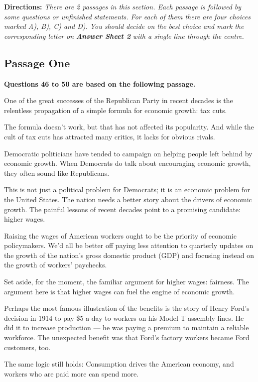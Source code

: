 \documentclass[UTF8,11pt]{ctexart}
\begin{document}
\textbf{Directions: }\textit{There are 2 passages in this section. Each passage is followed by some questions or unfinished} \textit{statements. For each of them there are four choices marked A), B), C) and D). You should decide on the best} \textit{choice and mark the corresponding letter on }\textbf{\textit{Answer Sheet 2}}\textit{ with a single line through the centre.}


\subsection*{\textbf{Passage One}}


\textbf{Questions 46 to 50 are based on the following passage.}


One of the great successes of the Republican Party in recent decades is the relentless propagation of a simple formula for economic growth: tax cuts.


The formula doesn’t work, but that has not affected its popularity. And while the cult of tax cuts has attracted many critics, it lacks for obvious rivals.


Democratic politicians have tended to campaign on helping people left behind by economic growth. When Democrats do talk about encouraging economic growth, they often sound like Republicans.


This is not just a political problem for Democrats; it is an economic problem for the United States. The nation needs a better story about the drivers of economic growth. The painful lessons of recent decades point to a promising candidate: higher wages.


Raising the wages of American workers ought to be the priority of economic policymakers. We’d all be better off paying less attention to quarterly updates on the growth of the nation’s gross domestic product (GDP) and focusing instead on the growth of workers’ paychecks.


Set aside, for the moment, the familiar argument for higher wages: fairness. The argument here is that higher wages can fuel the engine of economic growth.


Perhaps the most famous illustration of the benefits is the story of Henry Ford’s decision in 1914 to pay \$5 a day to workers on his Model T assembly lines. He did it to increase production — he was paying a premium to maintain a reliable workforce. The unexpected benefit was that Ford’s factory workers became Ford customers, too.


The same logic still holds: Consumption drives the American economy, and workers who are paid more can spend more.
\end{document}

